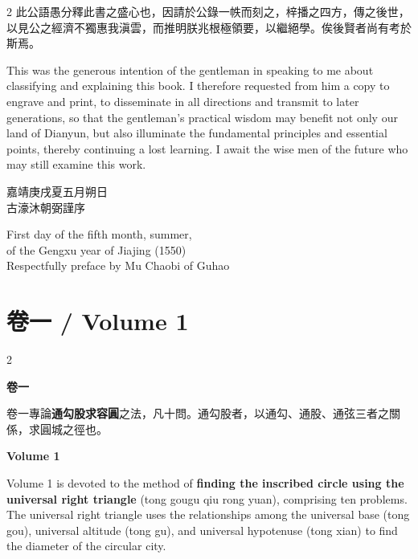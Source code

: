 \documentclass[11pt,a4paper]{article}
\newcounter{problem}[section]
\begin{document}
\begin{paracol}{2}
此公語愚分釋此書之盛心也，因請於公錄一帙而刻之，梓播之四方，傳之後世，以見公之經濟不獨惠我滇雲，而推明朕兆根極領要，以繼絕學。俟後賢者尚有考於斯焉。

\switchcolumn

This was the generous intention of the gentleman in speaking to me about classifying and explaining this book. I therefore requested from him a copy to engrave and print, to disseminate in all directions and transmit to later generations, so that the gentleman's practical wisdom may benefit not only our land of Dianyun, but also illuminate the fundamental principles and essential points, thereby continuing a lost learning. I await the wise men of the future who may still examine this work.

\switchcolumn

\begin{flushright}
嘉靖庚戌夏五月朔日\\
古濠沐朝弼謹序
\end{flushright}

\switchcolumn

\begin{flushright}
First day of the fifth month, summer,\\
of the Gengxu year of Jiajing (1550)\\
Respectfully preface by Mu Chaobi of Guhao
\end{flushright}

\end{paracol}

\clearpage

\section{卷一 / Volume 1}

\begin{paracol}{2}

\noindent\textbf{卷一}

\smallskip

卷一專論\textbf{通勾股求容圓}之法，凡十問。通勾股者，以通勾、通股、通弦三者之關係，求圓城之徑也。

\switchcolumn

\noindent\textbf{Volume 1}

\smallskip

Volume 1 is devoted to the method of \textbf{finding the inscribed circle using the universal right triangle} (tong gougu qiu rong yuan), comprising ten problems. The universal right triangle uses the relationships among the universal base (tong gou), universal altitude (tong gu), and universal hypotenuse (tong xian) to find the diameter of the circular city.

\end{paracol}
\end{document}
